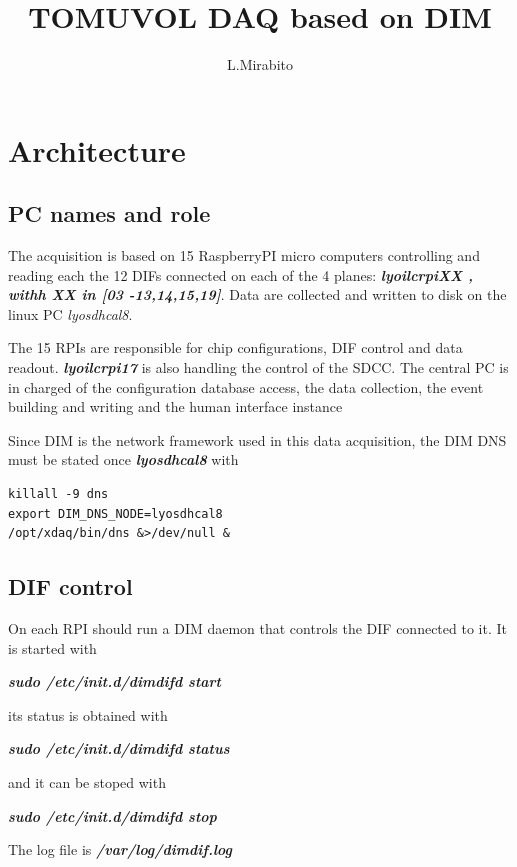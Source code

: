 \documentclass[english]{article}
\title{\textbf{TOMUVOL DAQ based on DIM}}
\author{L.Mirabito}
\date{}
\begin{document}
\maketitle

\section{Architecture}

\subsection{PC names and role}
The acquisition is based on 15 RaspberryPI micro computers controlling and reading each the 12 DIFs connected on each of the 4 planes: {\sl \bf lyoilcrpiXX , withh XX in [03 -13,14,15,19]}. Data are collected and written to disk on the linux PC {\sl lyosdhcal8}.

The 15 RPIs are responsible for chip configurations, DIF control and data readout. {\sl \bf lyoilcrpi17} is also handling the control of the SDCC. The central PC is in charged of the configuration database access, the data collection, the event building and writing and the human interface instance

Since DIM is the network framework used in this data acquisition, the DIM DNS must be stated once {\sl \bf lyosdhcal8} with
\begin{verbatim}
killall -9 dns
export DIM_DNS_NODE=lyosdhcal8
/opt/xdaq/bin/dns &>/dev/null &
\end{verbatim}

\subsection{DIF control}

On each RPI should run a DIM daemon that controls the DIF connected to it. It is started with

{\sl \bf sudo /etc/init.d/dimdifd start }

its status is obtained with 

{\sl \bf sudo /etc/init.d/dimdifd status }

and it can be stoped with

{\sl \bf sudo /etc/init.d/dimdifd stop }

The log file is {\sl \bf /var/log/dimdif.log }
\end{document}
